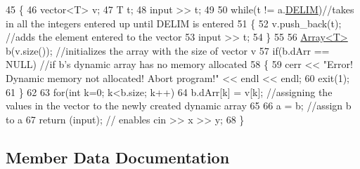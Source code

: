 \begin{DoxyCode}
45    \{
46       vector<T> v;
47       T t;
48       input >> t;
49 
50       \textcolor{keywordflow}{while}(t != a.\hyperlink{classArray_ab425400868a291283a14fc228a344bf0}{DELIM})\textcolor{comment}{//takes in all the integers entered up until DELIM is entered                
                                                                                                            }
51       \{
52          v.push\_back(t); \textcolor{comment}{//adds the element entered to the vector                                          
                                                                                                       }
53          input >> t;
54       \}
55 
56       \hyperlink{classArray}{Array<T>} b(v.size()); \textcolor{comment}{//initializes the array with the size of vector v                      
                                                                                                               }
57       \textcolor{keywordflow}{if}(b.dArr == NULL) \textcolor{comment}{//if b's dynamic array has no memory allocated                                    
                                                                                                       }
58       \{
59          cerr << \textcolor{stringliteral}{"Error! Dynamic memory not allocated! Abort program!"} << endl << endl;
60          exit(1);
61       \}
62 
63       \textcolor{keywordflow}{for}(\textcolor{keywordtype}{int} k=0; k<b.size; k++)
64          b.dArr[k] = v[k]; \textcolor{comment}{//assigning the values in the vector to the newly created dynamic array         
                                                                                                       }
65 
66       a = b; \textcolor{comment}{//assign b to a                                                                               
                                                                                                       }
67       return (input); \textcolor{comment}{// enables cin >> x >> y;                                                            
                                                                                                       }
68    \}
\end{DoxyCode}


\subsection{Member Data Documentation}

